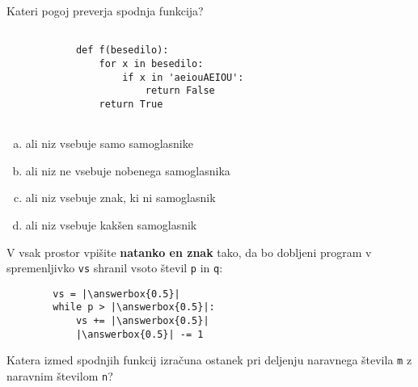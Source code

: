 \documentclass[arhiv, 10pt]{../izpit}
\newcommand{\inlinepy}[1]{\texttt{#1}}
\newcommand{\answerbox}[1]{\framebox{\vphantom{\large M}\hspace{#1cm}}}
\begin{document}
        \naloga*

        \begin{multicols}{2}
        \noindent
        Kateri pogoj preverja spodnja funkcija?
        \begin{verbatim}
        
            def f(besedilo):
                for x in besedilo:
                    if x in 'aeiouAEIOU':
                        return False
                return True
            
        \end{verbatim}

        \begin{enumerate}[(a)]
\item ali niz vsebuje samo samoglasnike
\item ali niz ne vsebuje nobenega samoglasnika
\item ali niz vsebuje znak, ki ni samoglasnik
\item ali niz vsebuje kakšen samoglasnik
\end{enumerate}

        \end{multicols}
    
        \naloga*
        \begin{multicols}{2}
        \noindent
        V vsak prostor vpišite \textbf{natanko en znak} tako, da bo dobljeni program v spremenljivko \inlinepy{vs} shranil vsoto števil \inlinepy{p} in \inlinepy{q}:
        
        \columnbreak
        \begin{verbatim}
        vs = |\answerbox{0.5}|
        while p > |\answerbox{0.5}|:
            vs += |\answerbox{0.5}|
            |\answerbox{0.5}| -= 1
        \end{verbatim}
        \end{multicols}
    
        \clearpage
        \naloga
        
        Katera izmed spodnjih funkcij izračuna ostanek pri deljenju naravnega števila \inlinepy{m} z naravnim številom \inlinepy{n}?
    
\end{document}
